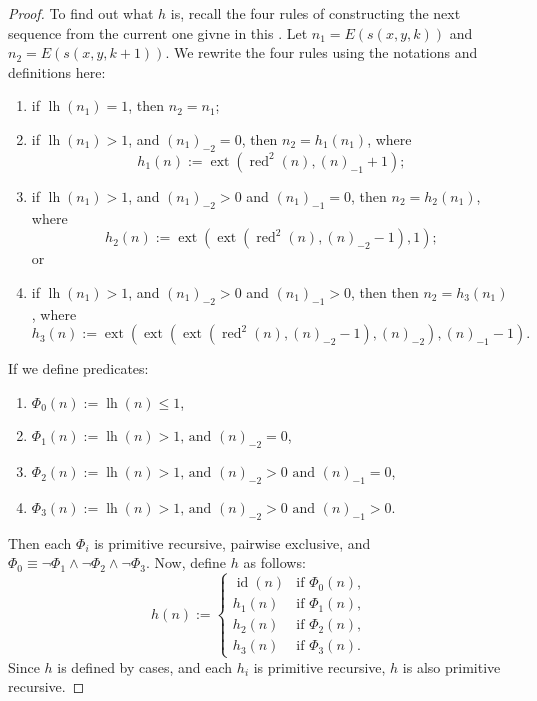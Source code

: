 \documentclass[12pt]{article}
\begin{document}
\begin{proof}
To find out what $h$ is, recall the four rules of constructing the next sequence from the current one givne in this .  Let $n_1=E(s(x,y,k))$ and $n_2=E(s(x,y,k+1))$.  We rewrite the four rules using the notations and definitions here:
\begin{enumerate}
\item if $\operatorname{lh}(n_1)=1$, then $n_2=n_1$;
\item if $\operatorname{lh}(n_1)>1$, and $(n_1)_{-2}=0$, then $n_2=h_1(n_1)$, where $$h_1(n):= \operatorname{ext}(\operatorname{red}^2(n),(n)_{-1}+1);$$
\item if $\operatorname{lh}(n_1)>1$, and $(n_1)_{-2}>0$ and $(n_1)_{-1}=0$, then $n_2=h_2(n_1)$, where $$h_2(n):=\operatorname{ext}(\operatorname{ext}(\operatorname{red}^2(n),(n)_{-2}-1),1);$$ or
\item if $\operatorname{lh}(n_1)>1$, and $(n_1)_{-2}>0$ and $(n_1)_{-1}>0$, then then $n_2=h_3(n_1)$, where $$h_3(n):=\operatorname{ext}(\operatorname{ext}(\operatorname{ext}(\operatorname{red}^2(n),(n)_{-2}-1),(n)_{-2}),(n)_{-1}-1).$$
\end{enumerate}
If we define predicates:
\begin{enumerate}
\item $\Phi_0(n):=\operatorname{lh}(n)\le 1$,
\item $\Phi_1(n):=\operatorname{lh}(n)>1\textrm{, and }(n)_{-2}=0$,
\item $\Phi_2(n):=\operatorname{lh}(n)>1\textrm{, and }(n)_{-2}>0\textrm{ and }(n)_{-1}=0$,
\item $\Phi_3(n):=\operatorname{lh}(n)>1\textrm{, and }(n)_{-2}>0\textrm{ and }(n)_{-1}>0$.
\end{enumerate}
Then each $\Phi_i$ is primitive recursive, pairwise exclusive, and $\Phi_0\equiv \neg \Phi_1 \wedge \neg \Phi_2 \wedge \neg \Phi_3$.  Now, define $h$ as follows:
\begin{displaymath}
h(n):= \left\{
\begin{array}{ll}
\operatorname{id}(n) & \textrm{if }\Phi_0(n),\\
h_1(n) & \textrm{if }\Phi_1(n),\\
h_2(n) & \textrm{if }\Phi_2(n),\\
h_3(n) & \textrm{if }\Phi_3(n).
\end{array}
\right.
\end{displaymath}
Since $h$ is defined by cases, and each $h_i$ is primitive recursive, $h$ is also primitive recursive.
\end{proof}
\end{document}
